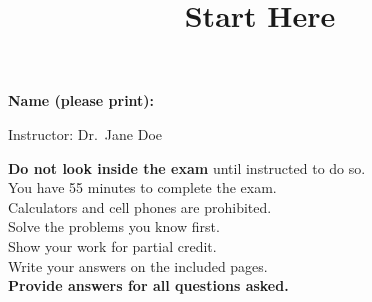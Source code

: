 \documentclass{ximera}
\title{Start Here}
\begin{document}
\begin{abstract}
\end{abstract}
\maketitle


\thispagestyle{empty}


\vfill

\noindent\textsf{\Large \textbf{Name (please print):}}\hrulefill



\noindent\textsf{\large Instructor: Dr.\ Jane Doe}


\vspace{1cm}

{\Large
  \noindent \textbf{Do not look inside the exam} until instructed to do so.\\[1em]
\noindent You have 55 minutes to complete the exam.\\[1em]
\noindent Calculators and cell phones are prohibited.\\[1em]
\noindent Solve the problems you know first.\\[1em]
\noindent Show your work for partial credit.\\[1em]
\noindent Write your answers on the included pages.\\[1em]
\noindent \textbf{Provide answers for all questions asked.}
}
\end{document}
